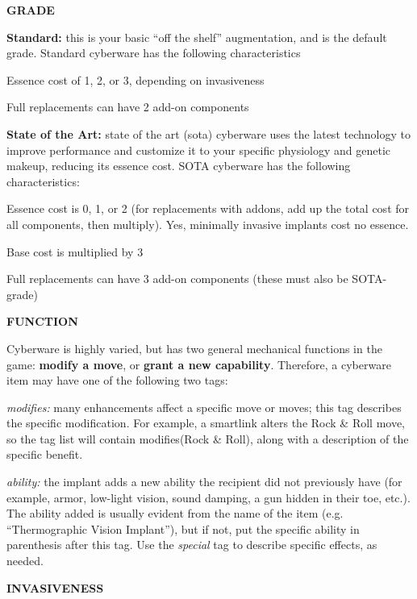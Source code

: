 \documentclass[oneside,10pt]{article}
\begin{document}
\begin{multicols}{2}
\textbf{\large GRADE}

\textbf{Standard:} this is your basic “off the shelf” augmentation,
and is the default grade. Standard cyberware has the following characteristics
\begin{adjustwidth*}{.5cm}{.5cm}

\tcirc{} Essence cost of 1, 2, or 3, depending on invasiveness

\tcirc{} Full replacements can have 2 add-on components
\end{adjustwidth*}
\textbf{State of the Art:} state of the art (sota) cyberware uses the
latest technology to improve performance and customize
it to your specific physiology and genetic makeup, reducing its essence cost. SOTA cyberware has the following
characteristics:
\begin{adjustwidth*}{.5cm}{.5cm}

\tcirc{} Essence cost is 0, 1, or 2 (for replacements with addons, add up the total cost for all components, then multiply). Yes, minimally invasive implants cost no essence.

\tcirc{} Base cost is multiplied by 3

\tcirc{} Full replacements can have 3 add-on components (these
must also be SOTA-grade)
\end{adjustwidth*}
\textbf{\large FUNCTION}

Cyberware is highly varied, but has two general mechanical
functions in the game: \textbf{modify a move}, or \textbf{grant a new capability}. Therefore, a cyberware item may have one of the
following two tags:
\begin{adjustwidth*}{.5cm}{.5cm}

\textit{modifies:} many enhancements affect a specific move or
moves; this tag describes the specific modification. For example, a smartlink alters the Rock \& Roll move, so the
tag list will contain modifies(Rock \& Roll), along with a
description of the specific benefit.

\textit{ability:} the implant adds a new ability the recipient did
not previously have (for example, armor, low-light vision,
sound damping, a gun hidden in their toe, etc.). The ability
added is usually evident from the name of the item (e.g.
“Thermographic Vision Implant”), but if not, put the specific ability in parenthesis after this tag. Use the \textit{special} tag to
describe specific effects, as needed.
\end{adjustwidth*}

\textbf{\large INVASIVENESS}


\end{multicols}
\end{document}
